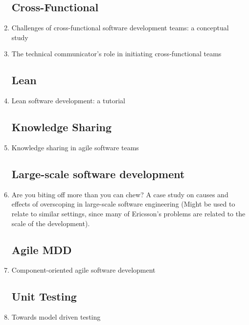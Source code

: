 \documentclass[ProjectPlan_innit.tex]{subfiles}
\begin{document}
\begin{enumerate}
\subsection{Cross-Functional}
\item Challenges of cross-functional software development teams: a conceptual study
\item The technical communicator's role in initiating cross-functional teams

\subsection{Lean}
\item Lean software development: a tutorial

\subsection{Knowledge Sharing}
\item Knowledge sharing in agile software teams

\subsection{Large-scale software development}
\item Are you biting off more than you can chew? A case study on causes and effects of overscoping in large-scale software engineering (Might be used to relate to similar settings, since many of Ericsson’s problems are related to the scale of the development).

\subsection{Agile MDD}
\item Component-oriented agile software development

\subsection{Unit Testing}
\item Towards model driven testing

\end{enumerate}
\end{document}
